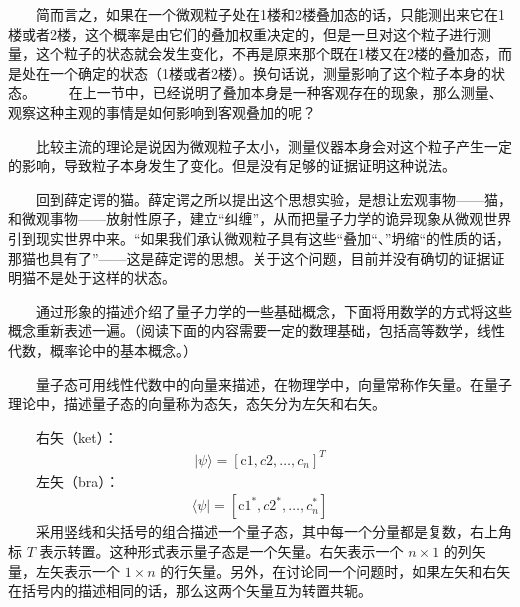 \documentclass[a4paper,11pt,english]{sphinxmanual}
\begin{document}
\sphinxAtStartPar
  简而言之，如果在一个微观粒子处在1楼和2楼叠加态的话，只能测出来它在1楼或者2楼，这个概率是由它们的叠加权重决定的，但是一旦对这个粒子进行测量，这个粒子的状态就会发生变化，不再是原来那个既在1楼又在2楼的叠加态，而是处在一个确定的状态（1楼或者2楼）。换句话说，测量影响了这个粒子本身的状态。   在上一节中，已经说明了叠加本身是一种客观存在的现象，那么测量、观察这种主观的事情是如何影响到客观叠加的呢？

\sphinxAtStartPar
  比较主流的理论是说因为微观粒子太小，测量仪器本身会对这个粒子产生一定的影响，导致粒子本身发生了变化。但是没有足够的证据证明这种说法。

\sphinxAtStartPar
  回到薛定谔的猫。薛定谔之所以提出这个思想实验，是想让宏观事物——猫，和微观事物——放射性原子，建立“纠缠”，从而把量子力学的诡异现象从微观世界引到现实世界中来。“如果我们承认微观粒子具有这些“叠加“、”坍缩“的性质的话，那猫也具有了”——这是薛定谔的思想。关于这个问题，目前并没有确切的证据证明猫不是处于这样的状态。

\sphinxAtStartPar
  通过形象的描述介绍了量子力学的一些基础概念，下面将用数学的方式将这些概念重新表述一遍。（阅读下面的内容需要一定的数理基础，包括高等数学，线性代数，概率论中的基本概念。）

\sphinxAtStartPar
{}

\sphinxAtStartPar
  量子态可用线性代数中的向量来描述，在物理学中，向量常称作矢量。在量子理论中，描述量子态的向量称为态矢，态矢分为左矢和右矢。

\sphinxAtStartPar
  右矢（ket）：
\begin{equation*}
\begin{split}|\psi\rangle=\left[\mathrm{c}{1}, c{2}, \ldots, c_{n}\right]^{T}\end{split}
\end{equation*}
\sphinxAtStartPar
  左矢（bra）：
\begin{equation*}
\begin{split}\langle\psi|=\left[\mathrm{c}{1}^{*}, c{2}^{*}, \ldots, c_{n}^{*}\right]\end{split}
\end{equation*}
\sphinxAtStartPar
  采用竖线和尖括号的组合描述一个量子态，其中每一个分量都是复数，右上角标 \(T\) 表示转置。这种形式表示量子态是一个矢量。右矢表示一个 \(n \times 1\) 的列矢量，左矢表示一个 \(1 \times n\) 的行矢量。另外，在讨论同一个问题时，如果左矢和右矢在括号内的描述相同的话，那么这两个矢量互为转置共轭。

\sphinxAtStartPar
{}
\end{document}

